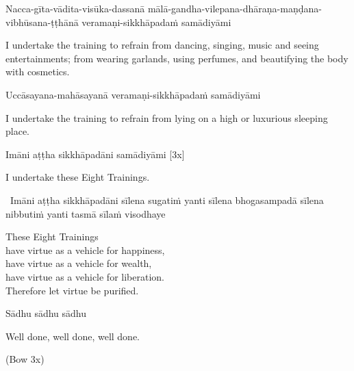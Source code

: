 \begin{pali-hang}
  Nacca-gīta-vādita-visūka-dassanā mālā-gandha-vilepana-dhāraṇa-maṇḍana-vibhūsana-ṭṭhānā veramaṇi-sikkhāpadaṁ samādiyāmi
\end{pali-hang}

\begin{english-hang}
  I undertake the training to refrain from dancing, singing, music and seeing entertainments; from wearing garlands, using perfumes, and beautifying the body with cosmetics.\ifdigitalversion\makeatletter\hyperlink{endnote143-appendix}\makeatother\fi\
\end{english-hang}

Uccāsayana-mahāsayanā veramaṇi-sikkhāpadaṁ samādiyāmi

\begin{english-hang}
  I undertake the training to refrain from lying on a high or luxurious sleeping place.
\end{english-hang}

Imāni aṭṭha sikkhāpadāni samādiyāmi \hfill{[3x]}

\begin{english}
  I undertake these Eight Trainings.
\end{english}

\begin{leader-only}
  \anglebracketleft\ \hspace{-0.5mm}Imāni aṭṭha sikkhāpadāni sīlena sugatiṁ yanti sīlena bhogasampadā sīlena nibbutiṁ yanti tasmā sīlaṁ visodhaye \hspace{-0.5mm}\anglebracketright\
\end{leader-only}

\begin{english-verses}
  These Eight Trainings\\
  have virtue as a vehicle for happiness,\\
  have virtue as a vehicle for wealth,\\
  have virtue as a vehicle for liberation.\\
  \linkdest{endnote144-body}
  Therefore let virtue be purified.\ifdigitalversion\makeatletter\hyperlink{endnote144-appendix}\makeatother\fi
\end{english-verses}

Sādhu sādhu sādhu

\begin{english}
  Well done, well done, well done.
\end{english}

\begin{center}
  (Bow 3x)
\end{center}

\clearpage

